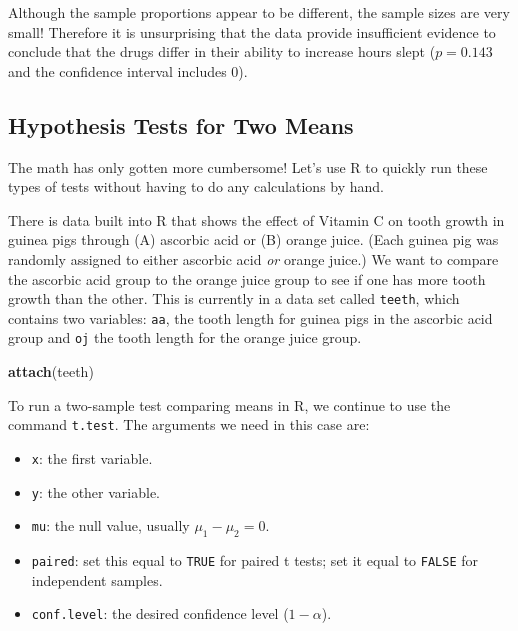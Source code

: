 \documentclass[
]{book}
\newenvironment{Shaded}{\begin{snugshade}}{\end{snugshade}}
\newcommand{\FunctionTok}[1]{\textcolor[rgb]{0.13,0.29,0.53}{\textbf{#1}}}
\newcommand{\NormalTok}[1]{#1}
\providecommand{\tightlist}{%
  \setlength{\itemsep}{0pt}\setlength{\parskip}{0pt}}
\begin{document}
Although the sample proportions appear to be different, the sample sizes are very small! Therefore it is unsurprising that the data provide insufficient evidence to conclude that the drugs differ in their ability to increase hours slept (\(p=0.143\) and the confidence interval includes \(0\)).

\subsection*{Hypothesis Tests for Two Means}\label{hypothesis-tests-for-two-means-1}

The math has only gotten more cumbersome! Let's use R to quickly run these types of tests without having to do any calculations by hand.

There is data built into R that shows the effect of Vitamin C on tooth growth in guinea pigs through (A) ascorbic acid or (B) orange juice. (Each guinea pig was randomly assigned to either ascorbic acid \emph{or} orange juice.) We want to compare the ascorbic acid group to the orange juice group to see if one has more tooth growth than the other. This is currently in a data set called \texttt{teeth}, which contains two variables: \texttt{aa}, the tooth length for guinea pigs in the ascorbic acid group and \texttt{oj} the tooth length for the orange juice group.

\begin{Shaded}
\begin{Highlighting}[]
\FunctionTok{attach}\NormalTok{(teeth)}
\end{Highlighting}
\end{Shaded}

To run a two-sample test comparing means in R, we continue to use the command \texttt{t.test}. The arguments we need in this case are:

\begin{itemize}
\tightlist
\item
  \texttt{x}: the first variable.
\item
  \texttt{y}: the other variable.
\item
  \texttt{mu}: the null value, usually \(\mu_1-\mu_2=0\).
\item
  \texttt{paired}: set this equal to \texttt{TRUE} for paired t tests; set it equal to \texttt{FALSE} for independent samples.
\item
  \texttt{conf.level}: the desired confidence level (\(1-\alpha\)).
\end{itemize}
\end{document}
